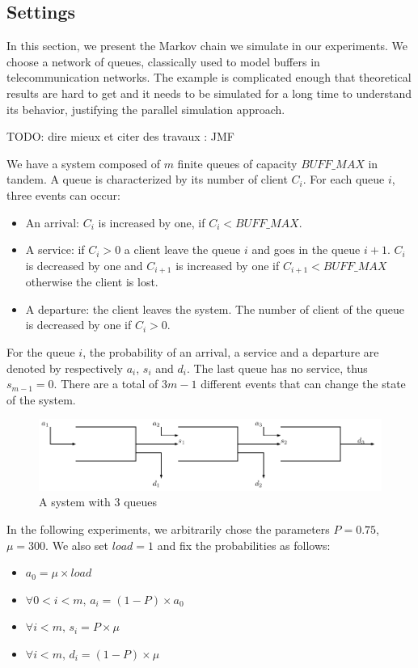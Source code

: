 \documentclass[a4paper,10pt]{article}
\newcommand{\todo}[1]{{\color{red} TODO: {#1}}}
\begin{document}
\subsection{Settings}
\label{sec:randomproc}

In this section, we present the Markov chain we simulate in our experiments. We choose a network of queues,
classically used to model buffers in telecommunication networks. The example is complicated enough that theoretical results are hard to get and it needs to be simulated for a long time to understand its behavior, justifying the parallel simulation approach.

\todo{dire mieux et citer des travaux : JMF}

We have a system composed of $m$ finite queues of capacity $BUFF\_MAX$ in tandem. A queue is characterized by its number of client $C_i$.  For each queue $i$, three events can occur:
\begin{itemize}
\item An arrival: $C_i$ is increased by one, if $C_i < BUFF\_MAX$.
\item A service: if $C_i > 0$ a client leave the queue $i$ and goes in the queue $i+1$. 
$C_i$ is decreased by one and $C_{i+1}$ is increased by one if $C_{i+1} < BUFF\_MAX$ otherwise the client is lost.
\item A departure: the client leaves the system. The number of client of the queue is decreased by one if $C_i >0$.

\end{itemize}

For the queue $i$, the probability of an arrival, a service and a departure are denoted by respectively $a_i$, $s_i$ and $d_i$. The last queue has no service, thus $s_{m-1} = 0 $. There are a total of $3m-1$ different events that can change the state of the system.
\begin{figure}[h]
 \includegraphics[scale=0.75]{tandem.pdf}
 \caption{A system with 3 queues}
\end{figure}

In the following experiments, we arbitrarily chose the parameters $P = 0.75$, $\mu = 300$. We also set $load =1$
and fix the probabilities as follows:
\begin{itemize}
\item $a_0 = \mu \times load$
\item $\forall 0 < i < m, \,a_i = (1-P) \times a_0$
\item $\forall i < m, \,s_i = P \times \mu$
\item $\forall i < m, \,d_i = (1-P) \times \mu$
\end{itemize}
\end{document}
